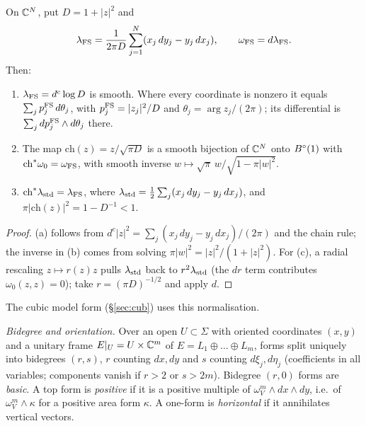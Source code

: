 \begin{lemma}\label{lem:pre-fs}
On $\mathbb{C}^N$, put $D=1+|z|^2$ and
\[
 \lambda_{\rm FS}=
 \frac{1}{2\pi D}\sum_{j=1}^N(x_j\,dy_j-y_j\,dx_j),\qquad
 \omega_{\rm FS}=d\lambda_{\rm FS}.
\]
Then:
\begin{enumerate}[label=(\alph*)]
\item $\lambda_{\rm FS}=d^c\log D$ is smooth. Where every coordinate is nonzero it equals
 $\sum_j p_j^{\rm FS}\,d\theta_j$, with $p_j^{\rm FS}=|z_j|^2/D$ and
 $\theta_j=\arg z_j/(2\pi)$; its differential is $\sum_jdp_j^{\rm FS}\wedge d\theta_j$ there.
\item The map $\mathrm{ch}(z)=z/\sqrt{\pi D}$ is a smooth bijection of $\mathbb{C}^N$ onto $B^{\circ}(1)$ with $\mathrm{ch}^*\omega_0=\omega_{\rm FS}$,
 with smooth inverse $w\mapsto\sqrt\pi\,w/\sqrt{1-\pi|w|^2}$.
\item $\mathrm{ch}^*\lambda_{\rm std}=\lambda_{\rm FS}$, where
 $\lambda_{\rm std}=\frac12\sum_j(x_j\,dy_j-y_j\,dx_j)$, and
 $\pi|\mathrm{ch}(z)|^2=1-D^{-1}<1$.
\end{enumerate}
\end{lemma}

\begin{proof}
(a) follows from $d^c|z|^2=\sum_j(x_j\,dy_j-y_j\,dx_j)/(2\pi)$ and the chain rule; the inverse in (b) comes from solving $\pi|w|^2=|z|^2/(1+|z|^2)$. For (c), a radial rescaling $z\mapsto r(z)z$ pulls $\lambda_{\rm std}$ back to $r^2\lambda_{\rm std}$ (the $dr$ term contributes $\omega_0(z,z)=0$); take $r=(\pi D)^{-1/2}$ and apply $d$.
\end{proof}

The cubic model form (\S\ref{sec:cub}) uses this normalisation.

\emph{Bidegree and orientation.} Over an open $U\subset\Sigma$ with oriented coordinates $(x,y)$ and a unitary frame $E|_U=U\times\mathbb{C}^m$ of $E=L_1\oplus\dots\oplus L_m$, forms split uniquely into bidegrees $(r,s)$, $r$ counting $dx,dy$ and $s$ counting $d\xi_j,d\eta_j$ (coefficients in all variables; components vanish if $r>2$ or $s>2m$). Bidegree $(r,0)$ forms are \emph{basic}. A top form is \emph{positive} if it is a positive multiple of $\omega_V^m\wedge dx\wedge dy$, i.e.\ of $\omega_V^m\wedge\kappa$ for a positive area form $\kappa$. A one-form is \emph{horizontal} if it annihilates vertical vectors.

